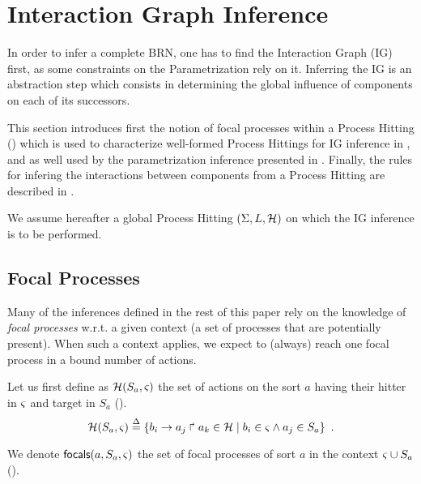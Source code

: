 \section{Interaction Graph Inference}\label{sec:infer-IG}

In order to infer a complete BRN, one has to find the Interaction Graph (IG) first, as some
constraints on the Parametrization rely on it.
Inferring the IG is an abstraction step which consists in determining the global influence of
components on each of its successors.

This section introduces first the notion of focal processes within a Process Hitting
() which is used to characterize well-formed Process Hittings for IG inference
in , and as well used by the parametrization inference presented in .
Finally, the rules for infering the interactions between components from a Process Hitting are
described in .

We assume hereafter a global Process Hitting $(\Sigma,L,\mathcal{H})$ on which the IG inference is to be
performed.

\subsection{Focal Processes}\label{ssec:focal}

Many of the inferences defined in the rest of this paper rely on the knowledge of \emph{focal
processes} w.r.t. a given context (a set of processes that are potentially present).
When such a context applies, we expect to (always) reach one focal process in a bound number of
actions.

Let us first define as $\mathcal{H}(S_a,\varsigma)$ the set of actions on the sort $a$ having their hitter in
$\varsigma$ and target in $S_a$ ().
\begin{equation}
\mathcal{H}(S_a,\varsigma) \stackrel{\Delta}= \{ b_i\rightarrow a_j\Rsh a_k\in\mathcal{H} \mid b_i\in\varsigma \wedge a_j\in S_a \}
\enspace.
\label{eq:PHa-ctx}
\end{equation}

We denote $\mathsf{focals}(a,S_a,\varsigma)$ the set of focal processes of sort $a$ in the context
$\varsigma\cup S_a$
().

